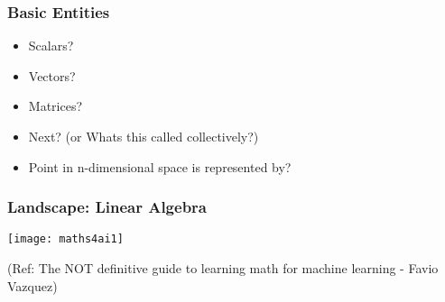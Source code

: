 \begin{frame}[fragile]\frametitle{Basic Entities}
\begin{itemize}
\item Scalars?
\item Vectors?
\item Matrices?
\item Next? (or Whats this called collectively?)
\item Point in n-dimensional space is represented by?
\end{itemize}
\end{frame}



 \begin{frame}[fragile] \frametitle{Landscape: Linear Algebra}

\begin{center}
\texttt{[image: maths4ai1]}
\end{center}

{\tiny (Ref: The NOT definitive guide to learning math for machine learning - Favio Vazquez)}

\end{frame}








